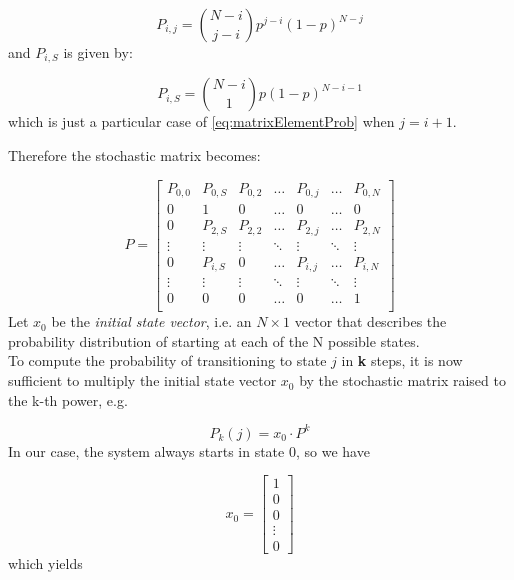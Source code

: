 \begin{equation}
	P_{i,j} = {N-i\choose j - i} p^{j - i} (1-p)^{N - j}
	\label{eq:matrixElementProb}
\end{equation}
\hfill \break
and $P_{i,S}$ is given by:

\begin{equation}
	P_{i,S} = {N-i\choose 1} p(1-p)^{N - i - 1}
	\label{eq:matrixProbToS}
\end{equation}
\hfill \break
which is just a particular case of \eqref{eq:matrixElementProb} when $j = i + 1$.
\hfill \break

Therefore the stochastic matrix becomes:

\begin{equation*}
P = 
\begin{bmatrix}
P_{0,0}	& P_{0,S}	& P_{0,2}	& \dots  	& P_{0,j}	& \dots		& P_{0,N} \\
0		& 1			& 0			& \dots  	& 0			& \dots		& 0		 \\
0		& P_{2,S}	& P_{2,2}	& \dots  	& P_{2,j}	& \dots		& P_{2,N} \\
\vdots	& \vdots	& \vdots	& \ddots 	& \vdots	& \ddots	& \vdots \\
0		& P_{i,S}	& 0			& \dots		& P_{i,j}	& \dots		& P_{i,N} \\
\vdots	& \vdots	& \vdots	& \ddots	& \vdots	& \ddots	& \vdots \\
0		& 0			& 0			& \dots  	& 0			& \dots		& 1		 \\
\end{bmatrix}
\label{stochasticMatrix2}
\end{equation*}
\hfill \break
Let $x_{0}$ be the \textit{initial state vector}, i.e. an $N \times 1$ vector that describes the probability distribution of starting at each of the N possible states.\\
To compute the probability of transitioning to state $j$ in \textbf{k} steps, it is now sufficient to multiply the initial state vector $x_{0}$ by the stochastic matrix raised to the k-th power, e.g.

\begin{equation}\label{probAtStateK1}
P_{k}(j) = x_{0}\cdot P^{k}
\end{equation}
\hfill \break
In our case, the system always starts in state 0, so we have

\begin{equation*}
x_{0} = 
\begin{bmatrix}
1 \\
0 \\
0 \\
\vdots \\
0
\end{bmatrix}
\label{initialStateVector}
\end{equation*}
\hfill \break
which yields


